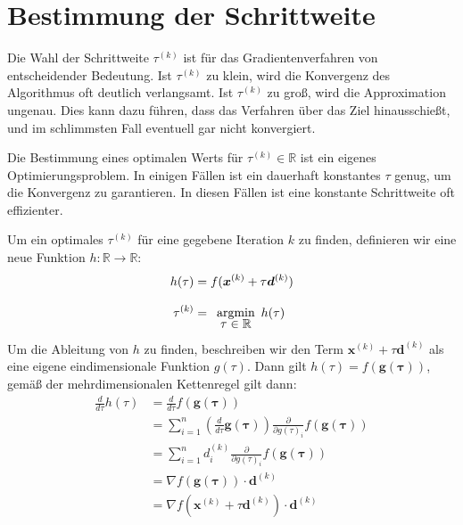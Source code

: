 \documentclass{report}
\newcommand{\argmin}[1] {
    \begin{array}{c}
        \vphantom{#1}\\[-3pt] %
        \text{argmin}\\[-3pt]
        #1\\
        \end{array}
    }
\newcommand{\pd}[2]{\frac{\partial #1}{\partial #2}}
\newcommand*{\newpar}{\par\vspace{\baselineskip}\noindent}
\begin{document}
\section{Bestimmung der Schrittweite}
Die Wahl der Schrittweite $\tau^{(k)}$ ist für das Gradientenverfahren von entscheidender Bedeutung. Ist $\tau^{(k)}$ zu klein, wird die Konvergenz des Algorithmus oft deutlich verlangsamt. Ist $\tau^{(k)}$ zu groß, wird die Approximation ungenau. Dies kann dazu führen, dass das Verfahren über das Ziel hinausschießt, und im schlimmsten Fall eventuell gar nicht konvergiert.
\newpar
Die Bestimmung eines optimalen Werts für $\tau^{(k)} \in \mathbb{R}$ ist ein eigenes Optimierungsproblem.  In einigen Fällen ist ein dauerhaft konstantes $\tau$ genug, um die Konvergenz zu garantieren. In diesen Fällen ist eine konstante Schrittweite oft effizienter.
\newpar
Um ein optimales $\tau^{(k)}$ für eine gegebene Iteration $k$ zu finden, definieren wir eine neue Funktion $h: \mathbb{R} \to \mathbb{R}$:
\begin{align*}
h(\tau) &= f(\bm{x}^{(k)} + \tau \bm{d}^{(k)})\\
 \tau^{(k)} &= \argmin{\tau \in \mathbb{R}} h(\tau)
\end{align*}
Um die Ableitung von $h$ zu finden, beschreiben wir den Term $\bm{x}^{(k)} + \tau \bm{d}^{(k)}$ als eine eigene eindimensionale Funktion $g(\tau)$. Dann gilt $h(\tau) = f(\bm{g(\tau)})$, gemäß der mehrdimensionalen Kettenregel gilt dann:
\begin{align*}
 \frac{d}{d\tau}h(\tau) &= \frac{d}{d\tau} f(\bm{g(\tau)})\\
 &= \sum_{i=1}^n \left(\frac{d}{d \tau} \bm{g(\tau)}\right) \pd{}{g(\tau)_i}f(\bm{g(\tau)})\\
 &= \sum_{i=1}^n d^{(k)}_i \pd{}{g(\tau)_i}f(\bm{g(\tau)})\\
 &= \nabla f(\bm{g(\tau)}) \cdot \bm{d}^{(k)}\\
 &= \nabla f(\bm{x}^{(k)} + \tau \bm{d}^{(k)}) \cdot \bm{d}^{(k)}
\end{align*}
\end{document}
